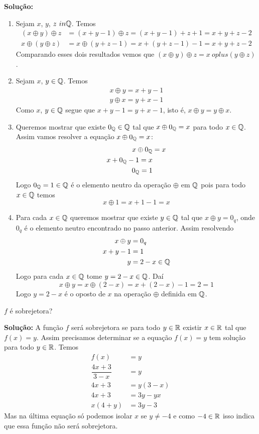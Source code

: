\documentclass[12pt]{article}
\begin{document}
\noindent\textbf{Solu\c{c}\~ao:}
\begin{enumerate}
	\item Sejam $x$, $y$, $z \ in \mathbb{Q}$. Temos
	\begin{align*}
		(x \oplus y) \oplus z &= (x + y - 1) \oplus z = (x + y - 1) + z + 1 = x + y + z - 2\\
		x \oplus (y \oplus z) &= x \oplus (y + z - 1) = x + (y + z - 1) - 1 = x + y + z - 2
	\end{align*}
	Comparando esses dois resultados vemos que $(x \oplus y) \oplus z = x \ oplus (y \oplus z)$.

	\item Sejam $x$, $y \in \mathbb{Q}$. Temos
	\begin{align*}
		x \oplus y = x + y - 1\\
		y \oplus x = y + x - 1
	\end{align*}
	Como $x$, $y \in \mathbb{Q}$ segue que $x + y - 1 = y + x - 1$, isto é, $x \oplus y = y \oplus x$.

	\item Queremos mostrar que existe $0_{\mathbb{Q}} \in \mathbb{Q}$ tal que $x \oplus 0_{\mathbb{Q}} = x$ para todo $x \in \mathbb{Q}$.
	Assim vamos resolver a equação $x \oplus 0_{\mathbb{Q}} = x$:
	\begin{align*}
		x\oplus 0_{\mathbb{Q}} &= x\\
		x + 0_{\mathbb{Q}} - 1 = x\\
		0_{\mathbb{Q}} = 1
	\end{align*}
	Logo $0_{\mathbb{Q}} = 1 \in \mathbb{Q}$ é o elemento neutro da operação $\oplus$ em $\mathbb{Q}$ pois para todo $x \in \mathbb{Q}$ temos
	\[
		x \oplus 1 = x + 1 - 1 = x
	\]

	\item Para cada $x \in \mathbb{Q}$ queremos mostrar que existe $y \in \mathbb{Q}$ tal que $x \oplus y = 0_q$, onde $0_q$ é o elemento neutro encontrado no passo anterior. Assim resolvendo
	\begin{align*}
		x \oplus y &= 0_q\\
		x + y - 1 &= 1\\
		y &= 2 - x \in \mathbb{Q}
	\end{align*}
	Logo para cada $x \in \mathbb{Q}$ tome $y = 2 - x \in \mathbb{Q}$. Daí
	\[
		x \oplus y = x \oplus (2 - x) = x + (2 - x) - 1 = 2 = 1
	\]
	Logo $y = 2 - x$ é o oposto de $x$ na operação $\oplus$ definida em $\mathbb{Q}$.
\end{enumerate}

\vspace{.5cm}

\questao $f$ é sobrejetora?

\noindent\textbf{Solu\c{c}\~ao:} A função $f$ será sobrejetora se para todo $y \in \mathbb{R}$ existir $x \in \mathbb{R}$ tal que $f(x) = y$. Assim precisamos determinar se a equação $f(x) = y$ tem solução para todo $y \in \mathbb{R}$.
Temos
\begin{align*}
	f(x) &= y\\
	\dfrac{4x + 3}{3 - x} &= y\\
	4x + 3 &= y(3 - x)\\
	4x + 3 &= 3y - yx\\
	x(4 + y) &= 3y - 3
\end{align*}
Mas na última equação só podemos isolar $x$ se $y \ne -4$ e como $-4 \in \mathbb{R}$ isso indica que essa função não será sobrejetora.
\end{document}
